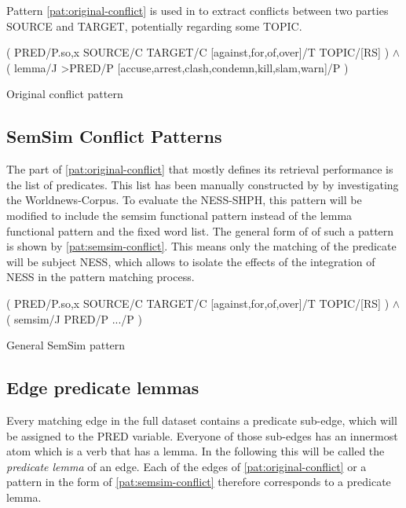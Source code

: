 \documentclass[11pt]{scrreprt}
\let\cite\parencite  %
\begin{document}
Pattern \ref{pat:original-conflict} is used in \cite[p.~22]{menezesSemanticHypergraphs2021} to extract conflicts between two parties \textsf{SOURCE} and \textsf{TARGET}, potentially regarding some \textsf{TOPIC}.

\begin{pattern}
  \normalfont\sffamily
  \centering
  ( PRED/P.{so,x} SOURCE/C TARGET/C [against,for,of,over]/T TOPIC/[RS] ) \(\wedge\)\\ 
  ( lemma/J >PRED/P [accuse,arrest,clash,condemn,kill,slam,warn]/P )
  \caption{Original conflict pattern}
  \label{pat:original-conflict}
\end{pattern}



\subsection{SemSim Conflict Patterns}
The part of \cref{pat:original-conflict} that mostly defines its retrieval performance is the list of predicates. This list has been manually constructed by \cite{menezesSemanticHypergraphs2021} by investigating the Worldnews-Corpus.  To evaluate the NESS-SHPH, this pattern will be modified to include the semsim functional pattern instead of the lemma functional pattern and the fixed word list. The general form of of such a pattern is shown by \cref{pat:semsim-conflict}. This means only the matching of the predicate will be subject NESS, which allows to isolate the effects of the integration of NESS in the pattern matching process. 

\begin{pattern}
  \normalfont\sffamily
  \centering
  ( PRED/P.{so,x} SOURCE/C TARGET/C [against,for,of,over]/T TOPIC/[RS] ) \(\wedge\)\\ 
  ( semsim/J PRED/P .../P )
  \caption{General SemSim pattern}
  \label{pat:semsim-conflict}
\end{pattern}


\subsection{Edge predicate lemmas}
Every matching edge in the full dataset contains a predicate sub-edge, which will be assigned to the \textsf{PRED} variable. Everyone of those sub-edges has an innermost atom which is a verb that has a lemma. In the following this will be called the \textit{predicate lemma} of an edge. Each of the edges of \cref{pat:original-conflict} or a pattern in the form of \cref{pat:semsim-conflict} therefore corresponds to a predicate lemma.
\end{document}
